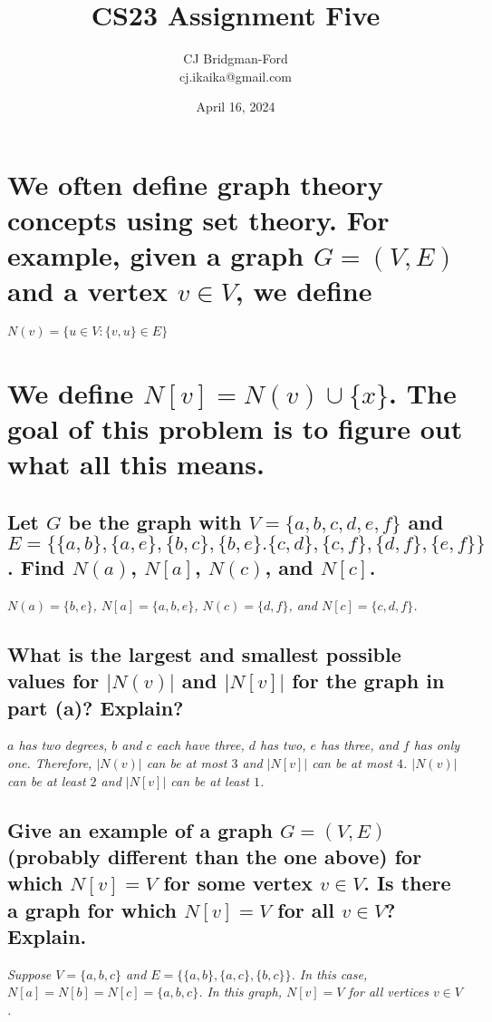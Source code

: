 \documentclass{article}
\title{CS23 Assignment Five}
\author{CJ Bridgman-Ford \\ cj.ikaika@gmail.com}
\date{April 16, 2024}
\begin{document}
\maketitle
\thispagestyle{empty}

\clearpage


\section{We often define graph theory concepts using set theory. For example, given a graph $G=(V,E)$ and a vertex $v \in V$, we define}
\begin{center}
    $N(v) = \{u \in V : \{v,u\}\in E\}$
\end{center}
\section*{\hspace{1cm}We define $N[v]=N(v)\cup\{x\}$. The goal of this problem is to figure out what all this means.}
\subsection{Let $G$ be the graph with $V=\{a,b,c,d,e,f\}$ and $E=\{\{a,b\},\{a,e\},\{b,c\},\{b,e\}.\{c,d\},\{c,f\},\{d,f\},\{e,f\}\}$. Find $N(a)$, $N[a]$, $N(c)$, and $N[c]$.}
\hspace{1cm}\textit{$N(a)=\{b,e\}$, $N[a]=\{a,b,e\}$, $N(c)=\{d,f\}$, and $N[c]=\{c,d,f\}$.}
\subsection{What is the largest and smallest possible values for $|N(v)|$ and $|N[v]|$ for the graph in part (a)? Explain?}
\hspace{1cm}\textit{$a$ has two degrees, $b$ and $c$ each have three, $d$ has two, $e$ has three, and $f$ has only one. Therefore, $|N(v)|$ can be at most $3$ and $|N[v]|$ can be at most $4$. $|N(v)|$ can be at least $2$ and $|N[v]|$ can be at least $1$.}
\subsection{Give an example of a graph $G=(V,E)$ (probably different than the one above) for which $N[v]=V$ for some vertex $v\in V$. Is there a graph for which $N[v]=V$ for all $v \in V$? Explain.}
\hspace{1cm}\textit{Suppose $V = \{a,b,c\}$ and $E = \{\{a,b\},\{a,c\},\{b,c\}\}$. In this case, $N[a]=N[b]=N[c]=\{a,b,c\}$. In this graph, $N[v]=V$ for all vertices $v\in V$.}
\end{document}
